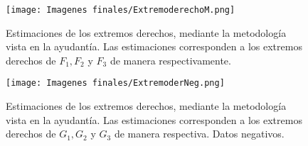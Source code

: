 \documentclass[10.5pt,notitlepage]{article}
\theoremstyle{plain}
\begin{document}
\begin{figure}[htb]
    \centering
    \texttt{[image: Imagenes finales/ExtremoderechoM.png]}
    \caption{Estimaciones de los extremos derechos, mediante la metodología vista en la ayudantía. Las estimaciones corresponden a los extremos derechos de \(F_1, F_2\) y \(F_3\) de manera respectivamente.}
    \label{ExtDerDGP} 
\end{figure}
\begin{figure}[htb]
    \centering
    \texttt{[image: Imagenes finales/ExtremoderNeg.png]}
    \caption{Estimaciones de los extremos derechos, mediante la metodología vista en la ayudantía. Las estimaciones corresponden a los extremos derechos de \(G_1, G_2\) y \(G_3\) de manera respectiva. Datos negativos.}
    \label{mExtDerDGP} 
\end{figure}






















\newpage
\end{document}
